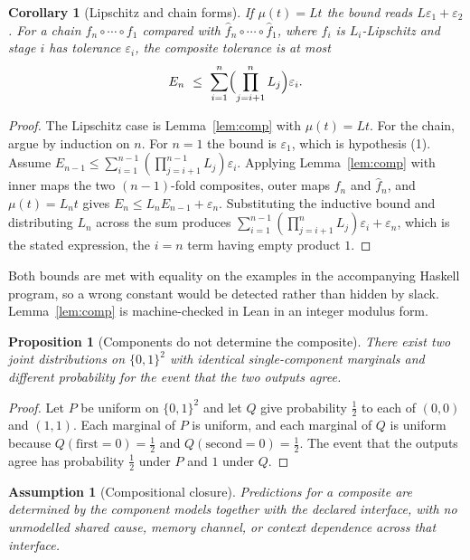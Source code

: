 \documentclass[11pt]{article}
\newtheorem{assumption}[definition]{Assumption}
\newtheorem{proposition}[definition]{Proposition}
\newtheorem{corollary}[definition]{Corollary}
\theoremstyle{definition}
\begin{document}
\begin{corollary}[Lipschitz and chain forms]
\label{cor:chain}
If $\mu(t)=Lt$ the bound reads $L\varepsilon_1+\varepsilon_2$. For a chain
$f_n\circ\cdots\circ f_1$ compared with $\widehat f_n\circ\cdots\circ\widehat f_1$,
where $f_i$ is $L_i$-Lipschitz and stage $i$ has tolerance $\varepsilon_i$, the
composite tolerance is at most
\[
E_n\ \le\ \sum_{i=1}^{n}\Bigl(\prod_{j=i+1}^{n}L_j\Bigr)\varepsilon_i .
\]
\end{corollary}
\begin{proof}
The Lipschitz case is Lemma~\ref{lem:comp} with $\mu(t)=Lt$. For the chain,
argue by induction on $n$. For $n=1$ the bound is $\varepsilon_1$, which is
hypothesis (1). Assume $E_{n-1}\le\sum_{i=1}^{n-1}(\prod_{j=i+1}^{n-1}L_j)\varepsilon_i$.
Applying Lemma~\ref{lem:comp} with inner maps the two $(n-1)$-fold composites,
outer maps $f_n$ and $\widehat f_n$, and $\mu(t)=L_nt$ gives
$E_n\le L_nE_{n-1}+\varepsilon_n$. Substituting the inductive bound and
distributing $L_n$ across the sum produces
$\sum_{i=1}^{n-1}(\prod_{j=i+1}^{n}L_j)\varepsilon_i+\varepsilon_n$, which is
the stated expression, the $i=n$ term having empty product $1$.
\end{proof}

Both bounds are met with equality on the examples in the accompanying Haskell
program, so a wrong constant would be detected rather than hidden by slack.
Lemma~\ref{lem:comp} is machine-checked in Lean in an integer modulus form.

\begin{proposition}[Components do not determine the composite]
\label{prop:joint}
There exist two joint distributions on $\{0,1\}^2$ with identical single-component
marginals and different probability for the event that the two outputs agree.
\end{proposition}
\begin{proof}
Let $P$ be uniform on $\{0,1\}^2$ and let $Q$ give probability $\tfrac12$ to
each of $(0,0)$ and $(1,1)$. Each marginal of $P$ is uniform, and each marginal
of $Q$ is uniform because $Q(\text{first}=0)=\tfrac12$ and
$Q(\text{second}=0)=\tfrac12$. The event that the outputs agree has probability
$\tfrac12$ under $P$ and $1$ under $Q$.
\end{proof}

\begin{assumption}[Compositional closure]
\label{ass:closurecomp}
Predictions for a composite are determined by the component models together with
the declared interface, with no unmodelled shared cause, memory channel, or
context dependence across that interface.
\end{assumption}
\end{document}
